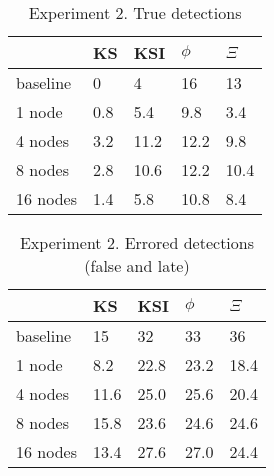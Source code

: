 \begin{table}[h]
    \centering
    \begin{tabular}{|l||l|l|l|l|}
        \hline
         & KS & KSI & $\phi$ & $\Xi$ \\ \hline
        baseline & 0 & 4 & 16 & 13 \\ \hline
        1 node & 0.8 & 5.4 & 9.8 & 3.4 \\ \hline
        4 nodes & 3.2 & 11.2 & 12.2 & 9.8 \\ \hline
        8 nodes & 2.8 & 10.6 & 12.2 & 10.4 \\ \hline
        16 nodes & 1.4 & 5.8 & 10.8 & 8.4 \\ \hline
    \end{tabular}
    \caption{Experiment 2. True detections}
\end{table}

\begin{table}[h]
    \centering
    \begin{tabular}{|l||l|l|l|l|}
        \hline
         & KS & KSI & $\phi$ & $\Xi$ \\ \hline
        baseline & 15 & 32 & 33 & 36 \\ \hline
        1 node & 8.2 & 22.8 & 23.2 & 18.4  \\ \hline
        4 nodes & 11.6 & 25.0 & 25.6 & 20.4 \\ \hline
        8 nodes & 15.8 & 23.6 & 24.6 & 24.6  \\ \hline
        16 nodes & 13.4 & 27.6 & 27.0 & 24.4 \\ \hline
    \end{tabular}
    \caption{Experiment 2. Errored detections (false and late)}
\end{table}


